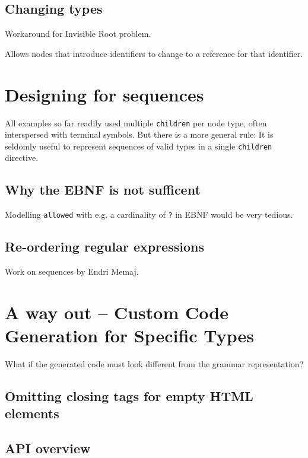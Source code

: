 \documentclass[]{report}
\begin{document}
\subsection{Changing types}
\label{sec:changing-types}

Workaround for Invisible Root problem.

Allows nodes that introduce identifiers to change to a reference for that identifier.

\section{Designing for sequences}
\label{sec:working-with-sequences}

All examples so far readily used multiple \texttt{children} per node type, often interspersed with terminal symbols. But there is a more general rule: It is seldomly useful to represent sequences of valid types in a single \texttt{children} directive.

\subsection{Why the EBNF is not sufficent}
\label{sec:why-the-ebnf-does-not-suffice}

Modelling \texttt{allowed} with e.g. a cardinality of \texttt{?} in EBNF would be very tedious.

\subsection{Re-ordering regular expressions}

Work on sequences by Endri Memaj.

\section{A way out -- Custom Code Generation for Specific Types}
\label{sec:possibility-custom-code-generation}

What if the generated code must look different from the grammar representation?

\subsection{Omitting closing tags for empty HTML elements}

\subsection{API overview}
\end{document}
